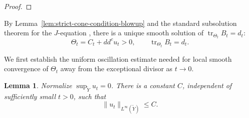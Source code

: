 \documentclass[reqno]{amsart}
\newcommand{\tr}{\operatorname{tr}}
\newcommand{\ddc}{dd^c}
\theoremstyle{plain}
\newtheorem{lemma}[thm]{Lemma}
\theoremstyle{remark}
\begin{document}
\begin{proof}
\end{proof}
By Lemma~\ref{lem:strict-cone-condition-blowup} and the standard
subsolution theorem for the $J$-equation \cite{SW08,C21}, there is a
unique smooth solution of $\tr_{\Theta_t}B_t=d_t$:
\begin{equation}\label{eq:resolution-J}
 \Theta_t=C_t+\ddc u_t>0,\qquad
 \tr_{\Theta_t}B_t=d_t.
\end{equation}

We first establish the uniform oscillation estimate needed for local
smooth convergence of $\Theta_t$ away from the exceptional divisor as
$t\to0$.
\begin{lemma}
\label{lem:uniform-oscillation}
Normalize $\sup_{\widetilde Y}u_t=0$.  There is a constant $C$,
independent of sufficiently small $t>0$, such that
\begin{equation}\label{eq:uniform-C0}
 \|u_t\|_{L^\infty(\widetilde Y)}\leq C.
\end{equation}
\end{lemma}
\end{document}
